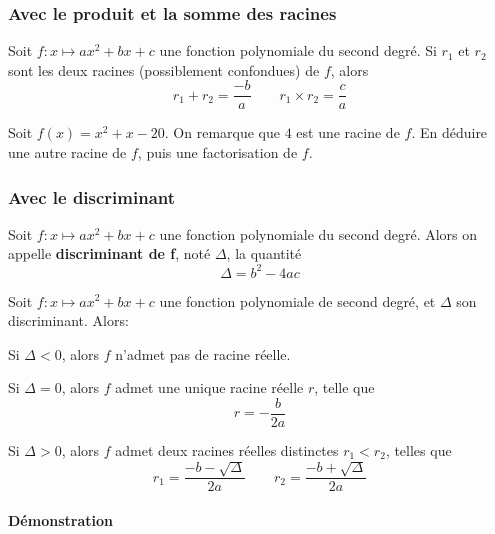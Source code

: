 \documentclass{poly}
\begin{document}
\subsubsection{Avec le produit et la somme des racines}
\begin{proposition}
Soit $f : x \mapsto ax^2 + bx + c$ une fonction polynomiale du second degré. Si $r_1$ et $r_2$ sont les deux racines (possiblement confondues) de $f$, alors
\begin{equation*}
r_1 + r_2 = \dfrac{-b}{a} \qquad r_1 \times r_2 = \dfrac{c}{a}
\end{equation*}
\end{proposition}
\begin{example}
Soit $f(x) = x^2 + x - 20$. On remarque que $4$ est une racine de $f$. En déduire une autre racine de $f$, puis une factorisation de $f$.
\vspace*{0.5cm}

\end{example}
\newpage
\subsubsection{Avec le discriminant}
\begin{tcolorbox}
\begin{definition}
Soit $f : x \mapsto ax^2 + bx + c$ une fonction polynomiale du second degré. Alors on appelle \textbf{discriminant de f}, noté $\Delta$, la quantité
\begin{equation*}
\Delta = b^2 - 4ac
\end{equation*} 
\end{definition}
\end{tcolorbox}
\begin{theorem}
Soit $f : x \mapsto ax^2 + bx + c$ une fonction polynomiale de second degré, et $\Delta$ son discriminant. Alors:
\begin{alphaquestions}
\item Si $\Delta < 0$, alors $f$ n'admet pas de racine réelle.
\item Si $\Delta = 0$, alors $f$ admet une unique racine réelle $r$, telle que
\begin{equation*}
r = - \dfrac{b}{2a}
\end{equation*}
\item Si $\Delta > 0$, alors $f$ admet deux racines réelles distinctes $r_1 < r_2$, telles que
\begin{equation*}
r_1 = \dfrac{- b - \sqrt{\Delta}}{2a} \qquad r_2 = \dfrac{- b + \sqrt{\Delta}}{2a}
\end{equation*}
\end{alphaquestions}
\end{theorem}
\paragraph{Démonstration}
\hfill
\vspace*{0.2cm}
\end{document}
